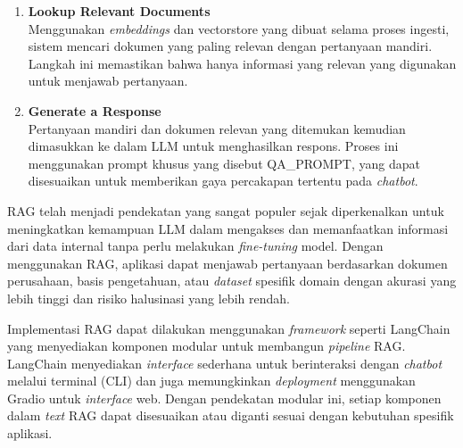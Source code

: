 \begin{enumerate}
\begin{enumerate}
    \item \textbf{Lookup Relevant Documents} \\
    Menggunakan \textit{embeddings} dan vectorstore yang dibuat selama proses ingesti, sistem mencari dokumen yang paling relevan dengan pertanyaan mandiri. Langkah ini memastikan bahwa hanya informasi yang relevan yang digunakan untuk menjawab pertanyaan.
    \item \textbf{Generate a Response} \\
    Pertanyaan mandiri dan dokumen relevan yang ditemukan kemudian dimasukkan ke dalam LLM untuk menghasilkan respons. Proses ini menggunakan prompt khusus yang disebut QA\_PROMPT, yang dapat disesuaikan untuk memberikan gaya percakapan tertentu pada \textit{chatbot}.
  \end{enumerate}
\end{enumerate}

RAG telah menjadi pendekatan yang sangat populer sejak diperkenalkan untuk meningkatkan kemampuan LLM dalam mengakses dan memanfaatkan informasi dari data internal tanpa perlu melakukan \textit{fine-tuning} model. Dengan menggunakan RAG, aplikasi dapat menjawab pertanyaan berdasarkan dokumen perusahaan, basis pengetahuan, atau \textit{dataset} spesifik domain dengan akurasi yang lebih tinggi dan risiko halusinasi yang lebih rendah.

Implementasi RAG dapat dilakukan menggunakan \textit{framework} seperti LangChain yang menyediakan komponen modular untuk membangun \textit{pipeline} RAG. LangChain menyediakan \textit{interface} sederhana untuk berinteraksi dengan \textit{chatbot} melalui terminal (CLI) dan juga memungkinkan \textit{deployment} menggunakan Gradio untuk \textit{interface} web. Dengan pendekatan modular ini, setiap komponen dalam \textit{text} RAG dapat disesuaikan atau diganti sesuai dengan kebutuhan spesifik aplikasi.